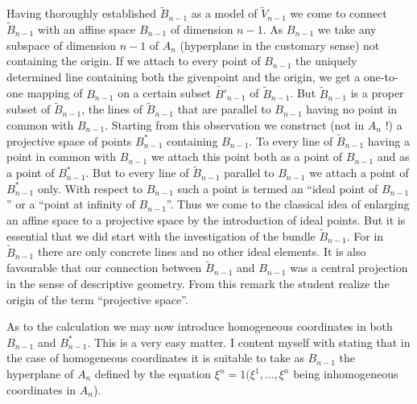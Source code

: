 Having thoroughly established $\tilde{B}_{n-1}$ as a model of
$\tilde{V}_{n-1}$ we come to connect $\tilde{B}_{n-1}$ with an affine
space $B_{n-1}$ of dimension $n-1$. As $B_{n-1}$ we take any subspace
of dimension $n-1$ of $A_n$ (hyperplane in the customary sense) not
containing the origin. If we attach to every point of $B_{n-1}$ the
uniquely determined line containing both the given\pageoriginale point
and the origin, we get a one-to-one mapping of $B_{n-1}$ on a certain
subset $\tilde{B'}_{n-1}$ of $\tilde{B}_{n-1}$. But $\tilde{B}_{n-1}$
is a proper subset of $\tilde{B}_{n-1}$, the lines of
$\tilde{B}_{n-1}$ that are parallel to $B_{n-1}$ having no point in
common with $B_{n-1}$. Starting from this observation we construct
(not in $A_n$ !) a projective space of points $B^\ast_{n-1}$
containing $B_{n-1}$. To every line of $\tilde{B}_{n-1}$ having a
point in common with $B_{n-1}$ we  attach this point both as a point
of $B_{n-1}$ and as a point of $B^\ast_{n-1}$. But to every line of
$\tilde{B}_{n-1}$ parallel to $B_{n-1}$ we attach a point of
$B^\ast_{n-1}$ only. With respect to $B_{n-1}$ such a point is termed
an ``ideal point of $B_{n-1}$'' or a ``point at infinity of
$B_{n-1}$''. Thus we come to the classical idea of enlarging an affine
space to a projective space by the introduction of ideal points. But
it is essential that we did start with the investigation of the bundle
$\tilde{B}_{n-1}$. For in $\tilde{B}_{n-1}$ there are only concrete
lines and no other ideal elements. It is also favourable that our
connection between $\tilde{B}_{n-1}$ and $B_{n-1}$ was a central
projection in the sense of descriptive geometry. From this remark the
student realize the origin of the term ``projective space''.

As to the calculation we may now introduce homogeneous coordinates in
both $B_{n-1}$ and $B^\ast_{n-1}$. This is a very easy matter. I
content myself with stating that in the case of homogeneous
coordinates it is suitable to take as $B_{n-1}$ the hyperplane of
$A_n$ defined by the equation $\xi^n =1 (\xi^1, \ldots, \xi^n$ being
inhomogeneous coordinates in $A_n$).

